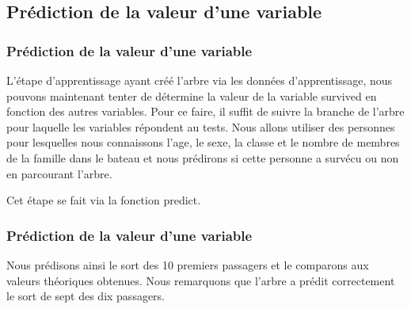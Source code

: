 \documentclass[compress]{beamer}
\begin{document}
\subsection{Prédiction de la valeur d'une variable}
\begin{frame}
\frametitle{Prédiction de la valeur d'une variable}
L'étape d'apprentissage ayant créé l'arbre via les données d'apprentissage, nous pouvons maintenant tenter de détermine la valeur de la variable \textrm{survived}
en fonction des autres variables. Pour ce faire, il suffit de suivre la branche de l'arbre pour laquelle les variables répondent au tests.\newline
 Nous allons utiliser des personnes pour lesquelles nous connaissons l'age, le sexe, la classe et le nombre de membres de la famille dans le bateau et nous prédirons
 si cette personne a survécu ou non en parcourant l'arbre.\newline

Cet étape se fait via la fonction \textrm{predict}. \newline
 
\end{frame}
\begin{frame}
\frametitle{Prédiction de la valeur d'une variable}
 

Nous prédisons ainsi le sort des 10 premiers passagers et le comparons aux valeurs théoriques obtenues. Nous remarquons que l'arbre a prédit correctement le sort
de sept des dix passagers.
\end{frame}
\end{document}
